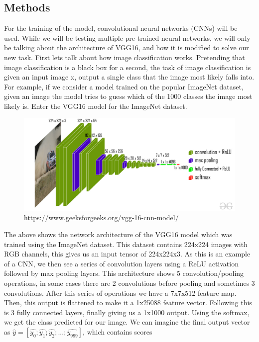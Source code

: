 \documentclass[12pt]{article}
\begin{document}
\subsection*{Methods}
\quad
For the training of the model, convolutional neural networks (CNNs) will be used. While we will be testing multiple pre-trained neural networks, we will only be talking about the architecture of VGG16, and how
it is modified to solve our new task. First lets talk about how image classification works. Pretending that image classification is a black box for a second, the task of image classification is given
an input image x, output a single class that the image most likely falls into. For example, if we consider a model trained on the popular ImageNet dataset, given an image the model tries to guess which of the
1000 classes the image most likely is. Enter the VGG16 model for the ImageNet dataset. \\
\begin{figure}[H]
    \centering
    \includegraphics[scale=0.25]{images/vgg-architechture.jpg}\\
    https://www.geeksforgeeks.org/vgg-16-cnn-model/
\end{figure}
The above shows the network architecture of the VGG16 model which was trained using the ImageNet dataset. This dataset contains 224x224 images with RGB channels, this gives us an input tensor of 224x224x3.
As this is an example of a CNN, we then see a series of convolution layers using a ReLU activation followed by max pooling layers. This architecture shows 5 convolution/pooling operations, in some cases there are 2 convolutions before 
pooling and sometimes 3 convolutions. After this series of operations we have a 7x7x512 feature map. Then, this output is flattened to make it a 1x25088 feature vector. Following this is 3 
fully connected layers, finally giving us a 1x1000 output. Using the softmax, we get the class predicted for our image. We can imagine the final output vector as $\hat{y} = [\hat{y_0}; \hat{y_1}; \hat{y_2}; ... ; \hat{y_{999}}]$, which contains scores
\end{document}
